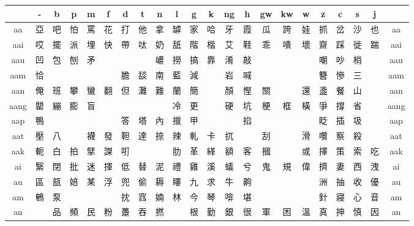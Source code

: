 \documentclass{article}
\begin{document}
	
\begin{adjustbox}{width=\textwidth, totalheight=\baselineskip,keepaspectratio}
	
\begin{tabular}{|>{\columncolor{mygray}}c|c|@{\hspace{1pt}}*{19}{c|@{\hspace{1pt}}} >{\columncolor{mygray}}c|}  
			
	\hline
	\rowcolor{mygray} & - & b & p & m & f & d & t & n & l & g & k & ng & h & gw & kw & w & z & c & s & j &  \\
	\hline
	aa & 亞 & 吧 & 怕 & 罵 & 花 & 打 & 他 & 拿 & 罅 & 家 & 哈 & 牙 & 霞 & 瓜 & 誇 & 娃 & 抓 & 岔 & 沙 & 也 & aa \\
	\hline
	aai & 哎 & 擺 & 派 & 埋 & 快 & 帶 & 呔 & 奶 & 舐 & 階 & 楷 & 艾 & 鞋 & 乖 & 嘳 & 壞 & 齋 & 踩 & 徙 & 踹 & aai \\
	\hline
	aau & 凹 & 包 & 刨 & 矛 &  &  &  & 嶩 & 撈 & 搞 & 靠 & 淆 & 敲 &  &  &  & 嘲 & 吵 & 梢 &  & aau \\
	\hline
	aam & 恰 &  &  &  &  & 膽 & 舕 & 南 & 藍 & 減 &  & 岩 & 喊 &  &  &  & 簪 & 慘 & 三 &  & aam \\
	\hline
	aan & 俺 & 班 & 攀 & 蠻 & 翻 & 但 & 灘 & 難 & 蘭 & 簡 &  & 顏 & 慳 & 關 &  & 還 & 盞 & 餐 & 山 &  & aan \\
	\hline
	aang & 罌 & 繃 & 膨 & 盲 &  &  &  &  & 冷 & 更 &  & 硬 & 坑 & 梗 & 框 & 橫 & 爭 & 撐 & 省 &  & aang \\
	\hline
	aap & 鴨 &  &  &  &  & 答 & 塔 & 內 & 擸 & 甲 &  &  & 掐 &  &  &  & 眨 & 插 & 圾 &  & aap \\
	\hline
	aat & 壓 & 八 &  & 襪 & 發 & 靼 & 達 & 捺 & 辣 & 軋 & 卡 & 扤 &  & 刮 &  & 滑 & 囋 & 察 & 殺 &  & aat \\
	\hline
	aak & 軛 & 白 & 拍 & 擘 & 謋 & 咑 &  &  & 肋 & 革 & 緙 & 額 & 客 & 摑 &  & 或 & 擇 & 策 & 索 & 吃 & aak \\
	\hline
	ai & 繄 & 閉 & 批 & 迷 & 揮 & 低 & 替 & 泥 & 禮 & 雞 & 溪 & 蟻 & 兮 & 鬼 & 規 & 偉 & 擠 & 妻 & 西 & 洩 & ai \\
	\hline
	au & 區 & 瓿 & 婄 & 某 & 浮 & 兜 & 偷 & 耨 & 瞜 & 九 & 求 & 牛 & 齁 &  &  &  & 洲 & 抽 & 收 & 優 & au \\
	\hline
	am & 鵪 & 泵 &  &  &  & 抌 & 窞 & 婻 & 林 & 今 & 琴 & 啽 & 堪 &  &  &  & 針 & 寢 & 心 & 音 & am \\
	\hline
	an &  & 品 & 頻 & 民 & 粉 & 躉 & 吞 & 撚 &  & 根 & 勤 & 銀 & 很 & 軍 & 困 & 溫 & 真 & 抻 & 慎 & 因 & an \\

\end{tabular}
\end{adjustbox}
\end{document}
